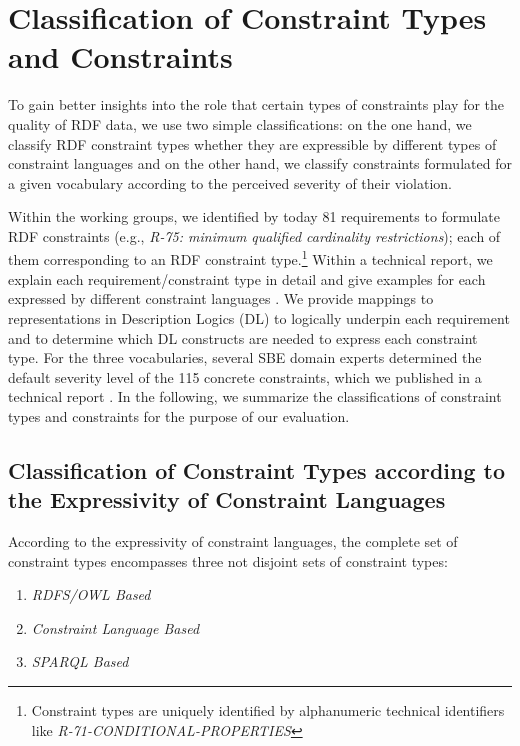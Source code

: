 \documentclass[conference]{IEEEtran}
\begin{document}
\section{Classification of Constraint Types and Constraints}
\label{classification}

To gain better insights into the role that certain types of constraints play for the quality of RDF data, we use two simple classifications: on the one hand, we classify RDF constraint types whether they are expressible by different types of constraint languages and on the other hand, we classify constraints formulated for a given vocabulary according to the perceived severity of their violation. 

Within the working groups, we identified by today 81 requirements to formulate RDF constraints (e.g., \emph{R-75: minimum qualified cardinality restrictions}); each of them corresponding to an RDF constraint type.\footnote{Constraint types are uniquely identified by alphanumeric technical identifiers like \emph{R-71-CONDITIONAL-PROPERTIES}} 
Within a technical report, we explain each requirement/constraint type in detail and give examples for each expressed by different constraint languages \cite{BoschNolleAcarEckert2015}. We provide mappings to representations in Description Logics (DL) \cite{Baader-2003} to logically underpin each requirement and to determine which DL constructs are needed to express each constraint type.
For the three vocabularies, several SBE domain experts determined the default severity level of the 115 concrete constraints, which we published in a technical report \cite{BoschZapilkoWackerowEckert2015}.
In the following, we summarize the classifications of constraint types and constraints for the purpose of our evaluation.

\subsection{Classification of Constraint Types according to the Expressivity of Constraint Languages}

According to the expressivity of constraint languages, the complete set of constraint types encompasses three not disjoint sets of constraint types:
\begin{enumerate}
	\item \emph{RDFS/OWL Based}
	\item \emph{Constraint Language Based}
	\item \emph{SPARQL Based}
\end{enumerate}
\end{document}

